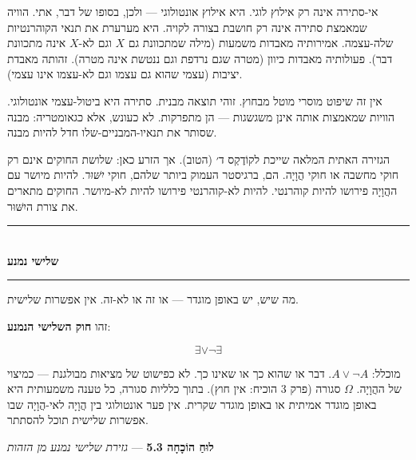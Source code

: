\documentclass[10pt, openany, oneside]{book}
\renewcommand{\normalsize}{\fontsize{10}{13}\selectfont}
\begin{document}
אי-סתירה אינה רק אילוץ לוגי. היא אילוץ אונטולוגי — ולכן, בסופו של דבר, אתי. הוויה שמאמצת סתירה אינה רק חושבת בצורה לקויה. היא מערערת את תנאי הקוהרנטיות שלה-עצמה. אמירותיה מאבדות משמעות (מילה שמתכוונת גם $X$ וגם לא-$X$ אינה מתכוונת דבר). פעולותיה מאבדות כיוון (מטרה שגם נרדפת וגם ננטשת אינה מטרה). זהותה מאבדת יציבות (עצמי שהוא גם עצמו וגם לא-עצמו אינו עצמי).

אין זה שיפוט מוסרי מוטל מבחוץ. זוהי תוצאה מבנית. סתירה היא ביטול-עצמי אונטולוגי. הוויות שמאמצות אותה אינן משגשגות — הן מתפרקות. לא כעונש, אלא כגאומטריה: מבנה שסותר את תנאיו-המבניים-שלו חדל להיות מבנה.

הגזירה האתית המלאה שייכת לקוֹדֶקְס ד׳ (הטוב). אך הזרע כאן: שלושת החוקים אינם רק חוקי מחשבה או חוקי הֲוָיָה. הם, ברגיסטר העמוק ביותר שלהם, חוקי \textit{יִשּׁוּר}. להיות מיושר עם ההֲוָיָה פירושו להיות קוהרנטי. להיות לא-קוהרנטי פירושו להיות לא-מיושר. החוקים מתארים את צורת היִשּׁוּר.

\vspace{1.5em}


\begin{center}
    \rule{0.3\textwidth}{0.4pt}\\[0.5em]
    {\normalsize\bfseries\textsc{שלישי נמנע}}\\[0.3em]
    \rule{0.3\textwidth}{0.4pt}
\end{center}

\vspace{1em}

\noindent מה שיש, יש באופן מוגדר — או זה או לא-זה. אין אפשרות שלישית.

זהו \textbf{חוק השלישי הנמנע}:

$$\exists \vee \neg\exists$$

מוכלל: $A \vee \neg A$. דבר או שהוא כך או שאינו כך. לא כפישוט של מציאות מבולגנת — כמיצוי של ההֲוָיָה. $\Omega$ סגורה (פרק 3 הוכיח: אין חוץ). בתוך כלליות סגורה, כל טענה משמעותית היא באופן מוגדר אמיתית או באופן מוגדר שקרית. אין פער אונטולוגי בין הֲוָיָה לאי-הֲוָיָה שבו אפשרות שלישית תוכל להסתתר.

\vspace{0.5em}

\textbf{לוּחַ הוֹכָחָה 5.3} --- \textit{גזירת שלישי נמנע מן הזהות}

\vspace{0.5em}
\end{document}
